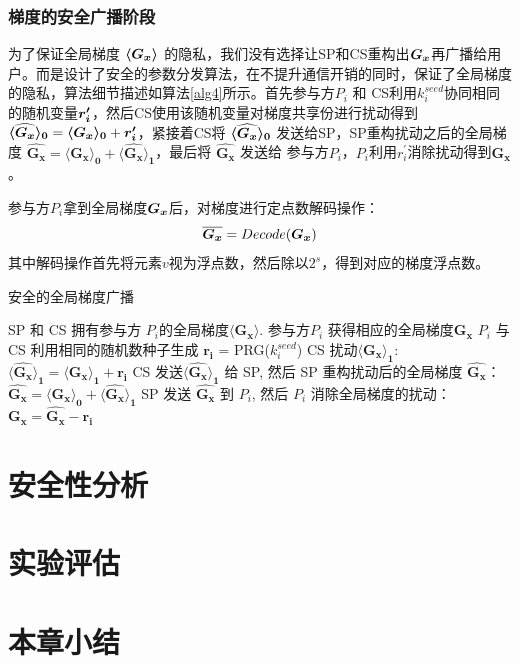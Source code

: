 \subsubsection{梯度的安全广播阶段}\label{distribution} 
为了保证全局梯度 $\svec{G_x}$ 的隐私，我们没有选择让SP和CS重构出$\bs{G_x}$再广播给用户。而是设计了安全的参数分发算法，在不提升通信开销的同时，保证了全局梯度的隐私，算法细节描述如算法\ref{alg4}所示。首先参与方$P_i$ 和 CS利用$k_i^{seed}$协同相同的随机变量$\bs{r_i^{\prime}}$，然后CS使用该随机变量对梯度共享份进行扰动得到 $\svec[0]{\widehat{G_x}} = \svec[0]{G_x} + \bs{r_i^{\prime}}$，紧接着CS将 $\svec[0]{\widehat{G_x}}$ 发送给SP，SP重构扰动之后的全局梯度 $\boldsymbol{\widehat{G_x}} = \boldsymbol{\langle G_x\rangle_0} + \boldsymbol{\langle \widehat{G_x}\rangle_1}$，最后将 $\boldsymbol{\widehat{G_x}}$ 发送给 参与方$P_i$，$P_i$利用$r_i^{\prime}$消除扰动得到$\boldsymbol{G_x}$。

参与方$P_i$拿到全局梯度$\bs{G_x}$后，对梯度进行定点数解码操作：
\begin{equation}
	\bs{\overline{G_x}} = Decode(\bs{G_x})
\end{equation}
其中解码操作首先将元素$v$视为浮点数，然后除以$2^s$，得到对应的梯度浮点数。

\begin{algorithm}[htbp]
	\caption{安全的全局梯度广播}
	\label{alg4}
	\begin{algorithmic}[1]
		\REQUIRE SP 和 CS 拥有参与方 $P_i$的全局梯度$\boldsymbol{\langle G_x\rangle}$.
		\ENSURE 参与方$P_i$ 获得相应的全局梯度$\boldsymbol{G_x}$
		\STATE $P_i$ 与 CS 利用相同的随机数种子生成 $\boldsymbol{r_i}$ = PRG($k_i^{seed}$) 
		\STATE CS 扰动$\boldsymbol{\langle G_x\rangle_1}$:\\ $\boldsymbol{\langle \widehat{G_x}\rangle_1} = \boldsymbol{\langle G_x\rangle_1} + \boldsymbol{r_i}$
		\STATE CS 发送$\boldsymbol{\langle \widehat{G_x}\rangle_1}$ 给 SP, 然后 SP 重构扰动后的全局梯度 $\boldsymbol{\widehat{G_x}}$：\\ $\boldsymbol{\widehat{G_x}} = \boldsymbol{\langle G_x\rangle_0} + \boldsymbol{\langle \widehat{G_x}\rangle_1}$
		\STATE SP 发送 $\boldsymbol{\widehat{G_x}}$ 到 $P_i$, 然后 $P_i$ 消除全局梯度的扰动：\\$\boldsymbol{G_x} = \boldsymbol{\widehat{G_x}} - \boldsymbol{r_i}$
	\end{algorithmic}
\end{algorithm}

\section{安全性分析}\label{4-analysis}

\section{实验评估}\label{4-exp}

\section{本章小结}\label{4-conclusion}